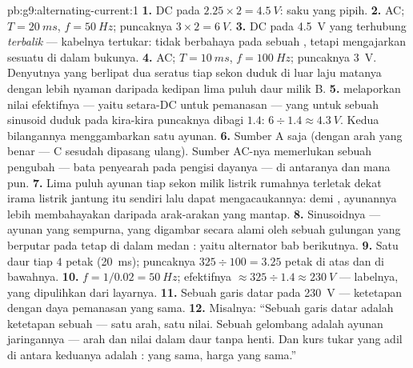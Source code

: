 \begin{solution}{pb:g9:alternating-current:1}
\textbf{1.} DC pada $2.25 \times 2 = \qty{4.5}{V}$:  saku yang
pipih.
\textbf{2.} AC; $T = \qty{20}{ms}$, $f = \qty{50}{Hz}$; puncaknya
$3 \times 2 = \qty{6}{V}$.
\textbf{3.} DC pada \qty{4.5}{V} yang terhubung \emph{terbalik} ---
kabelnya tertukar: tidak berbahaya pada sebuah , tetapi
mengajarkan sesuatu di dalam bukunya.
\textbf{4.} AC; $T = \qty{10}{ms}$, $f = \qty{100}{Hz}$;
puncaknya \qty{3}{V}. Denyutnya yang berlipat dua seratus tiap sekon
duduk di luar laju  matanya dengan lebih nyaman daripada
kedipan lima puluh daur milik B.
\textbf{5.}  melaporkan nilai efektifnya --- yaitu
setara-DC untuk pemanasan --- yang untuk sebuah sinusoid duduk pada
kira-kira puncaknya dibagi $1.4$: $6 \div 1.4 \approx
\qty{4.3}{V}$. Kedua bilangannya menggambarkan satu ayunan.
\textbf{6.} Sumber A saja (dengan arah yang benar --- C sesudah
dipasang ulang). Sumber AC-nya memerlukan sebuah pengubah --- bata
penyearah pada pengisi dayanya --- di antaranya dan  mana pun.
\textbf{7.} Lima puluh ayunan tiap sekon milik listrik rumahnya
terletak dekat irama listrik jantung itu sendiri lalu dapat
mengacaukannya:  demi , ayunannya lebih membahayakan
daripada arak-arakan yang mantap.
\textbf{8.} Sinusoidnya --- ayunan yang sempurna, yang digambar secara
alami oleh sebuah gulungan yang berputar pada  tetap di dalam
medan : yaitu alternator bab berikutnya.
\textbf{9.} Satu daur tiap $4$ petak (\qty{20}{ms}); puncaknya
$325 \div 100 = 3.25$ petak di atas dan di bawahnya.
\textbf{10.} $f = 1/0.02 = \qty{50}{Hz}$; efektifnya $\approx
325 \div 1.4 \approx \qty{230}{V}$ --- labelnya, yang dipulihkan dari
layarnya.
\textbf{11.} Sebuah garis datar pada \qty{230}{V} --- ketetapan dengan
daya pemanasan yang sama.
\textbf{12.} Misalnya: ``Sebuah garis datar adalah ketetapan sebuah
 --- satu arah, satu nilai. Sebuah gelombang adalah ayunan
jaringannya --- arah dan nilai dalam daur tanpa henti. Dan kurs tukar
yang adil di antara keduanya adalah :  yang
sama, harga yang sama.''
\end{solution}
